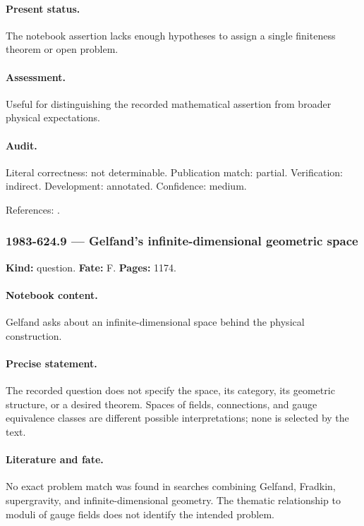 \paragraph{Present status.} The notebook assertion lacks enough hypotheses to assign a single finiteness theorem or open problem.

\paragraph{Assessment.} Useful for distinguishing the recorded mathematical assertion from broader physical expectations.

\paragraph{Audit.} Literal correctness: not determinable. Publication match: partial. Verification: indirect. Development: annotated. Confidence: medium.

\noindent References: \citep{fradkintseytlin1984instanton}.\par

\subsubsection{1983-624.9 --- Gelfand’s infinite-dimensional geometric space}

\label{item:1983-624.9}

\noindent\textbf{Kind:} question. \textbf{Fate:} F. \textbf{Pages:} 1174.\par

\paragraph{Notebook content.} Gelfand asks about an infinite-dimensional space behind the physical construction.

\paragraph{Precise statement.} The recorded question does not specify the space, its category, its geometric structure, or a desired theorem. Spaces of fields, connections, and gauge equivalence classes are different possible interpretations; none is selected by the text.

\paragraph{Literature and fate.} No exact problem match was found in searches combining Gelfand, Fradkin, supergravity, and infinite-dimensional geometry. The thematic relationship to moduli of gauge fields does not identify the intended problem.

